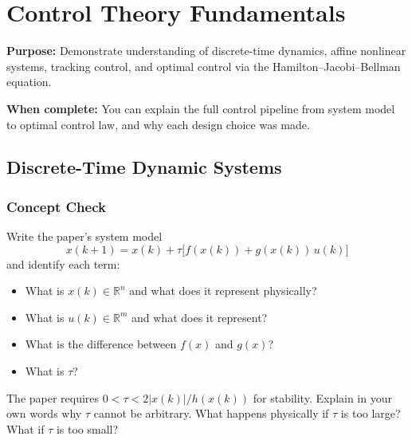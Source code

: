 \section{Control Theory Fundamentals}

\begin{purposebox}
\textbf{Purpose:} Demonstrate understanding of discrete-time dynamics, affine nonlinear systems, tracking control, and optimal control via the Hamilton--Jacobi--Bellman equation.

\textbf{When complete:} You can explain the full control pipeline from system model to optimal control law, and why each design choice was made.
\end{purposebox}

\subsection{Discrete-Time Dynamic Systems}

\subsubsection*{Concept Check}

Write the paper's system model
\[
  x(k+1) = x(k) + \tau\bigl[f(x(k)) + g(x(k))\,u(k)\bigr]
\]
and identify each term:
\begin{itemize}[nosep]
  \item What is $x(k) \in \mathbb{R}^n$ and what does it represent physically?
  \item What is $u(k) \in \mathbb{R}^m$ and what does it represent?
  \item What is the difference between $f(x)$ and $g(x)$?
  \item What is $\tau$?
\end{itemize}

\begin{answerbox}\end{answerbox}

The paper requires $0 < \tau < 2|x(k)|/h(x(k))$ for stability. Explain in your own words why $\tau$ cannot be arbitrary. What happens physically if $\tau$ is too large? What if $\tau$ is too small?

\begin{answerbox}\end{answerbox}


